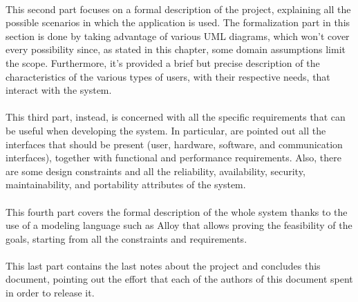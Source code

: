 \paragraph{} This second part focuses on a formal description of the project, explaining all the possible scenarios in which the application is used. The formalization part in this section is done by taking advantage of various UML diagrams, which won't cover every possibility since, as stated in this chapter, some domain assumptions limit the scope. Furthermore, it's provided a brief but precise description of the characteristics of the various types of users, with their respective needs, that interact with the system.

\paragraph{} This third part, instead, is concerned with all the specific requirements that can be useful when developing the system. In particular, are pointed out all the interfaces that should be present (user, hardware, software, and communication interfaces), together with functional and performance requirements. Also, there are some design constraints and all the reliability, availability, security, maintainability, and portability attributes of the system.

\paragraph{} This fourth part covers the formal description of the whole system thanks to the use of a modeling language such as Alloy that allows proving the feasibility of the goals, starting from all the constraints and requirements.

\paragraph{} This last part contains the last notes about the project and concludes this document, pointing out the effort that each of the authors of this document spent in order to release it.
